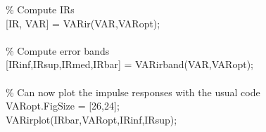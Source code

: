 \hspace{1mm}\hspace{5mm} \hspace{5mm} \hspace{5mm} \textcolor{matlabgreen}{\% Compute IRs }\\ 
\hspace{1mm}\hspace{5mm} \hspace{5mm} \hspace{5mm} [IR, VAR] = VARir(VAR,VARopt); \\ 
\hspace{1mm}\hspace{5mm} \hspace{5mm} \hspace{5mm}  \\ 
\hspace{1mm}\hspace{5mm} \hspace{5mm} \hspace{5mm} \textcolor{matlabgreen}{\% Compute error bands }\\ 
\hspace{1mm}\hspace{5mm} \hspace{5mm} \hspace{5mm} [IRinf,IRsup,IRmed,IRbar] = VARirband(VAR,VARopt); \\ 
\hspace{1mm}\hspace{5mm} \hspace{5mm} \hspace{5mm}  \\ 
\hspace{1mm}\hspace{5mm} \hspace{5mm} \hspace{5mm} \textcolor{matlabgreen}{\% Can now plot the impulse responses with the usual code }\\ 
\hspace{1mm}\hspace{5mm} \hspace{5mm} \hspace{5mm} VARopt.FigSize = [26,24]; \\ 
\hspace{1mm}\hspace{5mm} \hspace{5mm} \hspace{5mm} VARirplot(IRbar,VARopt,IRinf,IRsup); \\ 
